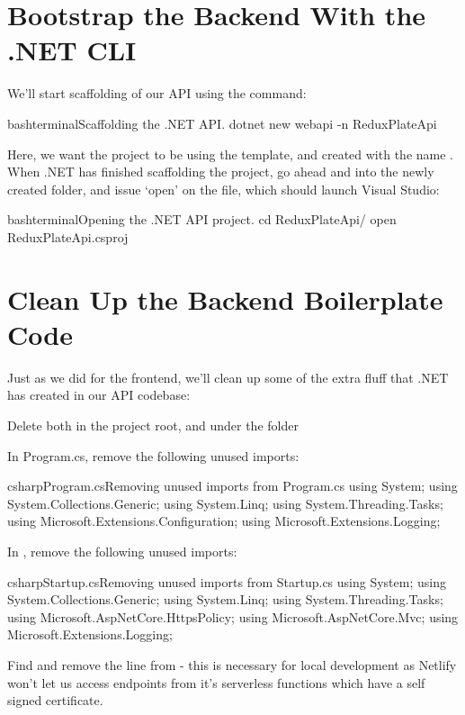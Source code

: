 \documentclass[paper=6in:9in,pagesize=pdftex,headinclude=on,footinclude=on,12pt,twoside]{scrbook}
\begin{document}
\section{Bootstrap the Backend With the .NET CLI}


We'll start scaffolding of our API using the  command:

\begin{codeInput}{bash}{terminal}{Scaffolding the .NET API.}
dotnet new webapi -n ReduxPlateApi
\end{codeInput}

Here, we want the project to be using the  template, and created with the name . When .NET has finished scaffolding the project, go ahead and  into the newly created  folder, and issue `open' on the  file, which should launch Visual Studio:

\begin{codeInput}{bash}{terminal}{Opening the .NET API project.}
cd ReduxPlateApi/
open ReduxPlateApi.csproj
\end{codeInput}

\section{Clean Up the Backend Boilerplate Code}

Just as we did for the frontend, we'll clean up some of the extra fluff that .NET has created in our API codebase:

\begin{arrows}
\item Delete both  in the project root, and  under the  folder
\item In Program.cs, remove the following unused imports:
\begin{codeInput}{csharp}{Program.cs}{Removing unused imports from Program.cs}
using System;
using System.Collections.Generic;
using System.Linq;
using System.Threading.Tasks;
using Microsoft.Extensions.Configuration;
using Microsoft.Extensions.Logging;
\end{codeInput}
\item In , remove the following unused imports:
\begin{codeInput}{csharp}{Startup.cs}{Removing unused imports from Startup.cs}
using System;
using System.Collections.Generic;
using System.Linq;
using System.Threading.Tasks;
using Microsoft.AspNetCore.HttpsPolicy;
using Microsoft.AspNetCore.Mvc;
using Microsoft.Extensions.Logging;
\item Find and remove the line  from  - this is necessary for local development as Netlify won't let us access endpoints from it's serverless functions which have a self signed certificate.
\end{codeInput}
\end{arrows}
\end{document}
